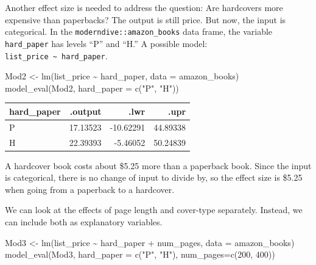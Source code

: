 \documentclass[
  letterpaper,
  DIV=11,
  numbers=noendperiod,
  oneside]{scrreprt}
\newenvironment{Shaded}{\begin{snugshade}}{\end{snugshade}}
\newcommand{\AttributeTok}[1]{\textcolor[rgb]{0.40,0.45,0.13}{#1}}
\newcommand{\DecValTok}[1]{\textcolor[rgb]{0.68,0.00,0.00}{#1}}
\newcommand{\FunctionTok}[1]{\textcolor[rgb]{0.28,0.35,0.67}{#1}}
\newcommand{\NormalTok}[1]{\textcolor[rgb]{0.00,0.23,0.31}{#1}}
\newcommand{\OtherTok}[1]{\textcolor[rgb]{0.00,0.23,0.31}{#1}}
\newcommand{\SpecialCharTok}[1]{\textcolor[rgb]{0.37,0.37,0.37}{#1}}
\newcommand{\StringTok}[1]{\textcolor[rgb]{0.13,0.47,0.30}{#1}}
\begin{document}
Another effect size is needed to address the question: Are hardcovers
more expensive than paperbacks? The output is still price. But now, the
input is categorical. In the \texttt{moderndive::amazon\_books} data
frame, the variable \texttt{hard\_paper} has levels ``P'' and ``H.'' A
possible model: \texttt{list\_price\ \textasciitilde{}\ hard\_paper}.

\begin{Shaded}
\begin{Highlighting}[]
\NormalTok{Mod2 }\OtherTok{\textless{}{-}} \FunctionTok{lm}\NormalTok{(list\_price }\SpecialCharTok{\textasciitilde{}}\NormalTok{ hard\_paper, }\AttributeTok{data =}\NormalTok{ amazon\_books)}
\FunctionTok{model\_eval}\NormalTok{(Mod2, }\AttributeTok{hard\_paper =} \FunctionTok{c}\NormalTok{(}\StringTok{"P"}\NormalTok{, }\StringTok{"H"}\NormalTok{))}
\end{Highlighting}
\end{Shaded}

\ttfamily 
\begin{tabular}{lrrr}
\toprule
hard\_paper & .output & .lwr & .upr\\
\midrule
P & 17.13523 & -10.62291 & 44.89338\\
H & 22.39393 & -5.46052 & 50.24839\\
\bottomrule
\end{tabular} \normalfont
\bigskip

A hardcover book costs about \$5.25 more than a paperback book. Since
the input is categorical, there is no change of input to divide by, so
the effect size is \$5.25 when going from a paperback to a hardcover.

We can look at the effects of page length and cover-type separately.
Instead, we can include both as explanatory variables.

\begin{Shaded}
\begin{Highlighting}[]
\NormalTok{Mod3 }\OtherTok{\textless{}{-}} \FunctionTok{lm}\NormalTok{(list\_price }\SpecialCharTok{\textasciitilde{}}\NormalTok{ hard\_paper }\SpecialCharTok{+}\NormalTok{ num\_pages, }\AttributeTok{data =}\NormalTok{ amazon\_books)}
\FunctionTok{model\_eval}\NormalTok{(Mod3, }\AttributeTok{hard\_paper =} \FunctionTok{c}\NormalTok{(}\StringTok{"P"}\NormalTok{, }\StringTok{"H"}\NormalTok{),  }\AttributeTok{num\_pages=}\FunctionTok{c}\NormalTok{(}\DecValTok{200}\NormalTok{, }\DecValTok{400}\NormalTok{))}
\end{Highlighting}
\end{Shaded}
\end{document}
